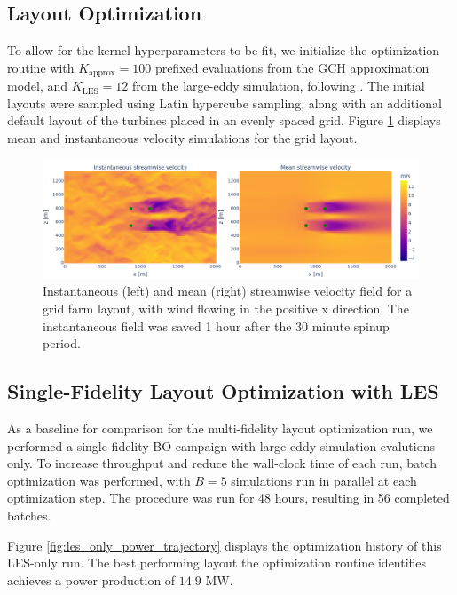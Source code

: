 \documentclass[11pt]{article}
\begin{document}
\subsection{Layout Optimization}

To allow for the kernel hyperparameters to be fit, we initialize the
optimization routine with $K_\text{approx} = 100$ prefixed evaluations from the
GCH approximation model, and $K_\text{LES} = 12$ from the large-eddy
simulation, following \cite{moleMultiFidelityBayesianOptimisation2024}. The
initial layouts were sampled using Latin hypercube sampling, along with an
additional default layout of the turbines placed in an evenly spaced grid.
Figure \ref{fig:streamwise_velocity} displays mean and instantaneous velocity simulations
for the grid layout.

\begin{figure}[htbp]
    \centering
    \includegraphics[scale=0.28]{grid_velocity_flow.png}
    \caption{
        Instantaneous (left) and mean (right) streamwise velocity field for a
        grid farm layout, with wind flowing in the positive x direction. The
        instantaneous field was saved 1 hour after the 30 minute spinup period.
    }
    \label{fig:streamwise_velocity}
\end{figure}

\subsection{Single-Fidelity Layout Optimization with LES}

As a baseline for comparison for the multi-fidelity layout optimization run, we
performed a single-fidelity BO campaign with large eddy simulation evalutions
only. To increase throughput and reduce the wall-clock time of each run, batch
optimization was performed, with $B = 5$ simulations run in parallel at each
optimization step. The procedure was run for 48 hours, resulting in 56 completed batches.

Figure \ref{fig:les_only_power_trajectory} displays the optimization history of
this LES-only run. The best performing layout the optimization routine identifies
achieves a power production of $14.9$ MW.
\end{document}
